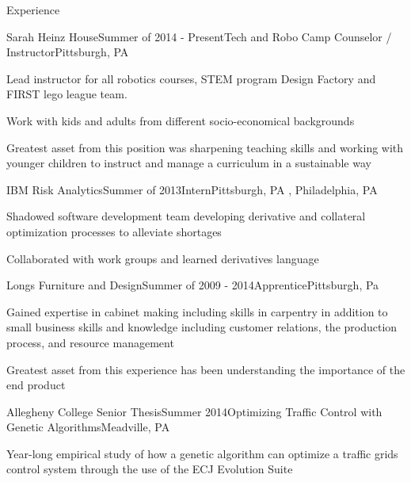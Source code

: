\documentclass{resume} %
\begin{document}
\begin{rSection}{Experience}

\begin{rSubsection}{Sarah Heinz House}{Summer of 2014 - Present}{Tech and Robo Camp Counselor / Instructor}{Pittsburgh, PA}
\item Lead instructor for all robotics courses, STEM program Design Factory and FIRST lego league team.
\item Work with kids and adults from different socio-economical backgrounds
\item Greatest asset from this position was sharpening teaching skills and working with younger children to instruct and manage a curriculum in a sustainable way
\end{rSubsection}
\begin{rSubsection}{IBM Risk Analytics}{Summer of 2013}{Intern}{Pittsburgh, PA , Philadelphia, PA}
\item Shadowed software development team developing derivative and collateral optimization processes to alleviate shortages
\item Collaborated with work groups and learned derivatives language
\end{rSubsection}

\begin{rSubsection}{Longs Furniture and Design}{Summer of 2009 - 2014}{Apprentice}{Pittsburgh, Pa}
\item Gained expertise in cabinet making including skills in carpentry  in addition to small business skills and knowledge including customer relations, the production process, and resource management
\item Greatest asset from this experience has been understanding the importance of the end product
\end{rSubsection}



\begin{rSubsection}{Allegheny College Senior Thesis}{Summer 2014}{Optimizing Traffic Control with Genetic Algorithms}{Meadville, PA}
\item Year-long empirical study of how a genetic algorithm can optimize a traffic grids control system through the use of the ECJ Evolution Suite
\end{rSubsection}


\end{rSection}
\end{document}
